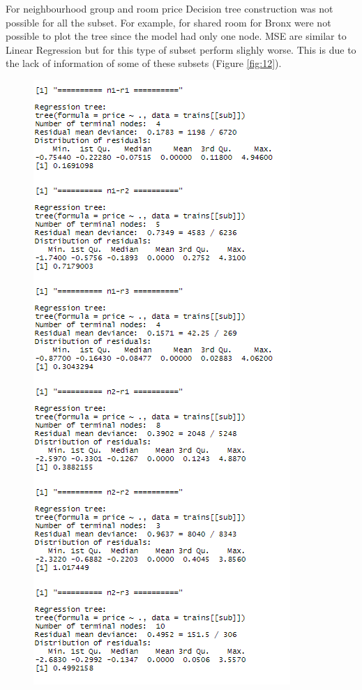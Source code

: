 \documentclass{FR16}
\begin{document}
\noindent For neighbourhood group and room price Decision tree construction was not possible for all the subset. For example, for shared room for Bronx were not possible to plot the tree since the model had only one node. MSE are similar to Linear Regression but for this type of subset perform slighly worse. This is due to the lack of information of some of these subsets (Figure \ref{fig:12}).
\newpage
\begin{figure}[!htb]
   \begin{minipage}{0.48\textwidth}
     \centering
     \includegraphics[width=.7\linewidth]{figures/dt2.PNG} 
   \end{minipage}\hfill

\end{figure}
\end{document}
